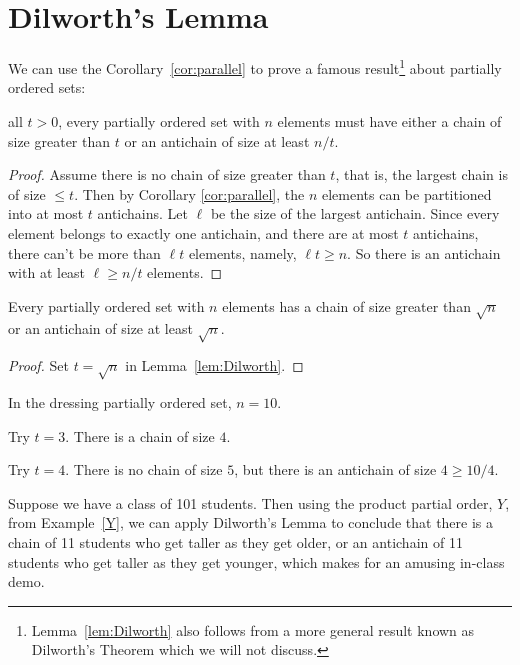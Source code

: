 \section{Dilworth's Lemma}

We can use the Corollary~\ref{cor:parallel} to prove a famous
result\footnote{Lemma~\ref{lem:Dilworth} also follows from a more general
result known as Dilworth's Theorem which we will not discuss.} about
partially ordered sets:

\begin{lemma}[Dilworth]\label{lem:Dilworth}
 all $t>0$, every partially ordered set with
$n$ elements must have either a chain of size greater than $t$ or an
antichain of size at least $n / t$.
\end{lemma}

\begin{proof}
Assume there is no chain of size greater than $t$, that is, the largest
chain is of size $\le t$.  Then by Corollary \ref{cor:parallel}, the $n$
elements can be partitioned into at most $t$ antichains.  Let $\ell$ be
the size of the largest antichain.  Since every element belongs to exactly
one antichain, and there are at most $t$ antichains, there can't be more
than $\ell t$ elements, namely, $\ell t \geq n$.  So there is an antichain
with at least $\ell \geq n / t$ elements.
\end{proof}

\begin{corollary}\label{cor:Dilworth}
Every partially ordered set with $n$ elements has a chain of size greater
than $\sqrt{n}$ or an antichain of size at least $\sqrt{n}$.

\begin{proof}
  Set $t = \sqrt{n}$ in Lemma~\ref{lem:Dilworth}.
\end{proof}
\end{corollary}

\begin{example}
In the dressing partially ordered set, $n = 10$.

Try $t = 3$.  There is a chain of size $4$.

Try $t = 4$.  There is no chain of size $5$, but there is an antichain of
size $4 \geq 10 / 4$.
\end{example}

\begin{example}
Suppose we have a class of 101 students.  Then using the product partial
order, $Y$, from Example~\ref{Y}, we can apply Dilworth's Lemma to
conclude that there is a chain of 11 students who get taller as they get
older, or an antichain of 11 students who get taller as they get younger,
which makes for an amusing in-class demo.
\end{example}

